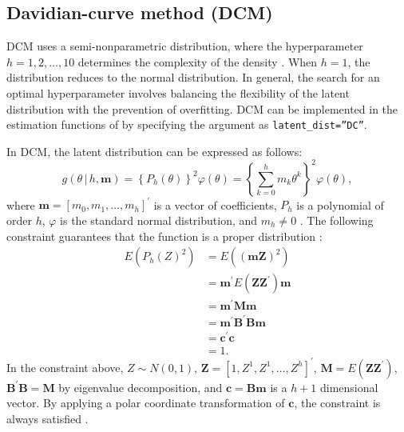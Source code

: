 \hypertarget{davidian-curve-method-dcm}{%
\subsection{Davidian-curve method (DCM)}\label{davidian-curve-method-dcm}}

DCM uses a semi-nonparametric distribution, where the hyperparameter
\(h = 1, 2, \dots, 10\) determines the complexity of the density
\citep{Woods+Lin:2009}. When \(h = 1\), the distribution reduces to the normal
distribution. In general, the search for an optimal hyperparameter involves
balancing the flexibility of the latent distribution with the prevention of overfitting.
DCM can be implemented in the estimation functions of 
by specifying the argument as \texttt{latent\_dist=”DC”}.

In DCM, the latent distribution can be expressed as follows:
\begin{equation}
g{\left( \theta \, | \, h, \mathrm{\mathbf{m}}\right)} =
\left\{ P_{h}{( \theta )} \right\}^{2} \varphi{(\theta)} =
\left\{ \sum_{k = 0}^{h}{m_{k} \theta^{k}} \right\}^{2} \varphi{(\theta)} ,
\label{eq:dcm}
\end{equation}
where \(\mathrm{\mathbf{m}} = \left[ m_0, m_1, \dots, m_h \right]^{'}\)
is a vector of coefficients, \(P_h\) is a polynomial of order \(h\),
\(\varphi\) is the standard normal distribution, and \(m_h \ne 0\)
\citep{Woods+Lin:2009, Zhang+Davidian:2001}. The following constraint
guarantees that the function is a proper distribution
\citep{Zhang+Davidian:2001}:
\begin{equation}
\begin{split}
E{\left( P_{h}{(Z)^{2}}\right)}
&= E{\left( (\mathrm{\mathbf{mZ}} )^{2}\right)} \\
&= \mathrm{\mathbf{m}}^{'} E{\left( \mathrm{\mathbf{ZZ}}^{'} \right)} \mathrm{\mathbf{m}} \\
&= \mathrm{\mathbf{m}}^{'} \mathrm{\mathbf{Mm}} \\
&= \mathrm{\mathbf{m}}^{'} \mathrm{\mathbf{B}}^{'} \mathrm{\mathbf{Bm}} \\
&= \mathrm{\mathbf{c}}^{'} \mathrm{\mathbf{c}} \\
&= 1.
\end{split}
\label{eq:constraint}
\end{equation}
In the constraint above, \(Z \sim N{(0, 1)}\),
\(\mathrm{\mathbf{Z}} = \left[ 1, Z^1, Z^1, \dots, Z^h \right]^{'}\),
\(\mathrm{\mathbf{M}} = E{\left( \mathrm{\mathbf{ZZ}}^{'} \right)}\),
\(\mathrm{\mathbf{B}}^{'} \mathrm{\mathbf{B}} = \mathrm{\mathbf{M}}\)
by eigenvalue decomposition, and
\(\mathrm{\mathbf{c}} = \mathrm{\mathbf{Bm}}\) is a \(h + 1\) dimensional
vector. By applying a polar coordinate transformation of \(\mathrm{\mathbf{c}}\), the
constraint is always satisfied \citep[see][]{Woods+Lin:2009, Zhang+Davidian:2001}.

